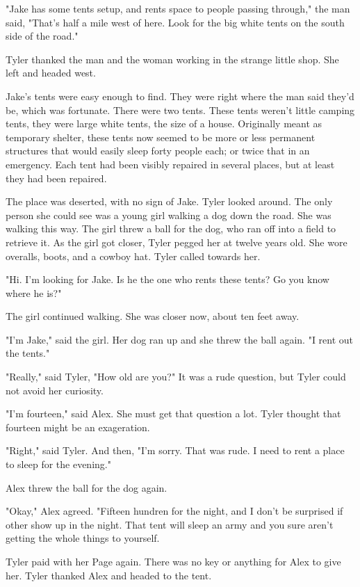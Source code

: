 \documentclass[courier]{sffms}
\begin{document}
"Jake has some tents setup, and rents space to people
passing through," the man said, "That's half a mile west of here.
Look for the big white tents on the south side of the road."

Tyler thanked the man and the woman working in the strange
little shop. She left and headed west.

Jake's tents were easy enough to find. They were right where
the man said they'd be, which was fortunate. There were
two tents. These tents
weren't little camping tents, they were large white tents, the size
of a house. Originally meant as temporary shelter, these
tents now seemed to be more or less permanent structures that
would easily sleep forty people each; or twice that in an
emergency. Each tent had been visibly repaired in several places,
but at least they had been repaired.

The place was deserted, with no sign of Jake. Tyler looked around.
The only person she could see was a young girl walking a dog
down the road. She was walking this way. The girl threw a ball for
the dog, who ran off into a field to retrieve it. As the girl got
closer, Tyler pegged her at twelve years old. She wore overalls, boots,
and a cowboy hat. Tyler called towards her.

"Hi. I'm looking for Jake. Is he the one who rents these tents? Go you
know where he is?"

The girl continued walking. She was closer now, about ten feet away.

"I'm Jake," said the girl. Her dog ran up and she threw the ball again.
"I rent out the tents."

"Really," said Tyler, "How old are you?" It was a rude question, but
Tyler could not avoid her curiosity.

"I'm fourteen," said Alex. She must get that question a lot.
Tyler thought that fourteen might be an exageration.

"Right," said Tyler. And then, "I'm sorry. That was rude. I need to rent a
place to sleep for the evening."

Alex threw the ball for the dog again.

"Okay," Alex agreed. "Fifteen hundren for the night, and I don't be
surprised if other show up in the night. That tent will sleep an
army and you sure aren't getting the whole things to yourself.

Tyler paid with her Page again. There was no key or anything for
Alex to give her. Tyler thanked Alex and headed to the tent.
\end{document}
